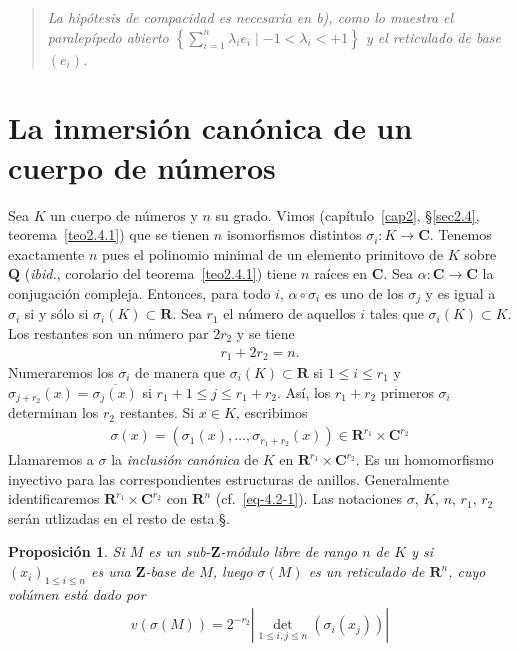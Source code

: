 \documentclass[bibtotoc,leqno,spanish]{amsbook}
\newcommand{\RR}{\mathbf{R}}
\newcommand{\QQ}{\mathbf{Q}}
\newcommand{\ZZ}{\mathbf{Z}}
\newcommand{\CC}{\mathbf{C}}
\newcommand{\oline}[1]{\overline{#1}}
\newcommand{\abs}[1]{\left\lvert#1\right\rvert}
\renewcommand{\to}[1][]{\xrightarrow{#1}}
\numberwithin{equation}{section}
\newenvironment{comm}%
	{\begin{quotation}\itshape\Small}
	{\end{quotation}}
\theoremstyle{note}
\theoremstyle{note}
\newtheorem{proposition}{Proposici\'on}
\theoremstyle{rem}
\numberwithin{theorem}{section}
\numberwithin{proposition}{section}
\numberwithin{definition}{section}
\numberwithin{lemma}{section}
\numberwithin{corollary}{section}
\numberwithin{example}{section}
\numberwithin{footnote}{section}%
\begin{document}
\begin{comm}
La hip\'otesis de compacidad es necesaria en b), como lo muestra el paralep\'ipedo abierto
$\left\{\sum_{i=1}^{n}\lambda_{i}e_{i}\mid-1<\lambda_{i}<+1\right\}$ y el reticulado de base $(e_{i})$.
\end{comm}

\section{La inmersi\'on can\'onica de un cuerpo de n\'umeros}\label{sec4.2}

Sea $K$ un cuerpo de n\'umeros y $n$ su grado. Vimos
(cap\'itulo~\ref{cap2}, \S\ref{sec2.4}, teorema~\ref{teo2.4.1}) que se tienen $n$
isomorfismos distintos $\sigma_{i}:K\to\CC$. Tenemos exactamente $n$ pues el polinomio minimal de
un elemento primitovo de $K$ sobre $\QQ$ ({\em ibid.}, corolario del teorema~\ref{teo2.4.1}) tiene $n$ ra\'ices en $\CC$. Sea
$\alpha:\CC\to\CC$ la conjugaci\'on compleja. Entonces, para todo $i$, $\alpha\circ\sigma_{i}$ es uno
de los $\sigma_{j}$ y es igual a $\sigma_{i}$ si y s\'olo si $\sigma_{i}(K)\subset\RR$. Sea $r_{1}$ el n\'umero
de aquellos $i$ tales que $\sigma_{i}(K)\subset K$. Los restantes son un n\'umero par $2r_{2}$ y
se tiene
\begin{gather}\label{eq-4.2-1}
r_{1}+2r_{2}=n.
\end{gather}
Numeraremos los $\sigma_{i}$ de manera que $\sigma_{i}(K)\subset\RR$ si $1\leq i\leq r_{1}$ y
$\sigma_{j+r_{2}}(x) = \oline{\sigma_{j}(x)}$ si $r_{1}+1\leq j\leq r_{1}+r_{2}$. As\'i, los $r_{1}+r_{2}$
primeros $\sigma_{i}$ determinan los $r_{2}$ restantes. Si $x\in K$, escribimos
\begin{gather}
\sigma(x) = (\sigma_{1}(x),\dots,\sigma_{r_{1}+r_{2}}(x))\in\RR^{r_{1}}\times\CC^{r_{2}}
\end{gather}
Llamaremos a $\sigma$ la {\em inclusi\'on can\'onica} de $K$ en $\RR^{r_{1}}\times\CC^{r_{2}}$. Es un
homomorfismo inyectivo para las correspondientes estructuras de anillos. Generalmente identificaremos
$\RR^{r_{1}}\times\CC^{r_{2}}$ con $\RR^{n}$ (cf.~\eqref{eq-4.2-1}). Las notaciones $\sigma$, $K$, $n$, $r_{1}$, $r_{2}$
ser\'an utlizadas en el resto de esta \S.

\begin{proposition}\label{prop4.2.1}
Si $M$ es un sub-$\ZZ$-m\'odulo libre de rango $n$ de $K$ y si $(x_{i})_{1\leq i\leq n}$ es una $\ZZ$-base
de $M$, luego $\sigma(M)$ es un reticulado de $\RR^{n}$, cuyo vol\'umen est\'a dado por
\begin{gather}\label{eq-4.2-3}
v(\sigma(M)) = 2^{-r_{2}}\abs{\det_{1\leq i,j\leq n}(\sigma_{i}(x_{j}))}
\end{gather}
\end{proposition}
\end{document}
